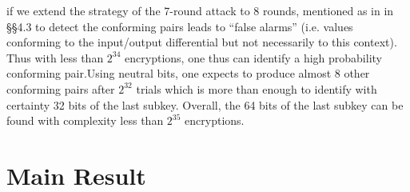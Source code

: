 \documentclass[preprint]{transcrypto}
\begin{document}
if we extend the strategy of the 7-round attack to 8 rounds, mentioned as in in §§4.3 to detect the conforming pairs leads to “false alarms” (i.e. values conforming to the input/output differential
but not necessarily to this context). Thus with less than $2^{34}$ encryptions, one thus can identify a high probability conforming pair.Using neutral bits, one expects to produce almost 8 other conforming pairs after $2^{32}$ trials which is more than enough to identify with certainty 32 bits
of the last subkey. Overall, the 64 bits of the last subkey can be found with complexity less than
$2^{35}$ encryptions.\\

\section{Main Result}
\label{sec:main}



\end{document}
